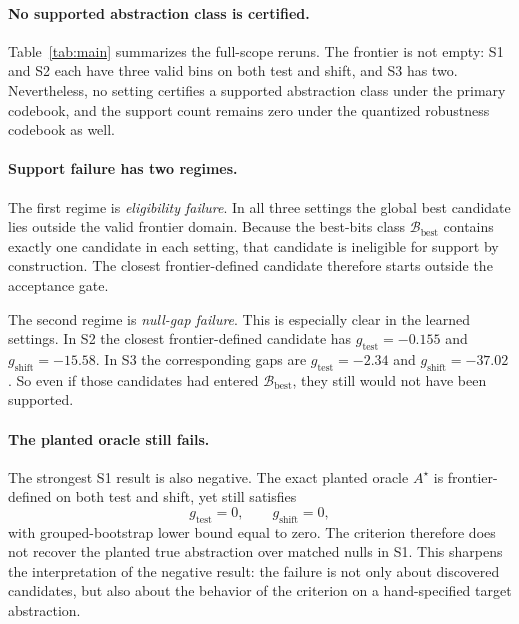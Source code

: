 \documentclass[10pt]{article}
\newcommand{\gtest}{g_{\mathrm{test}}}
\newcommand{\gshift}{g_{\mathrm{shift}}}
\newcommand{\Astar}{A^{\star}}
\newcommand{\Bbest}{\mathcal{B}_{\mathrm{best}}}
\begin{document}
\begin{table}[t]
\caption{\textbf{Main full-scope results.} ``Closest frontier-defined'' denotes the frontier-defined candidate with smallest test total bits/example. $\Delta$ is its gap in test bits/example to the global best candidate. In every setting, the best-bits class contains exactly one candidate, and that candidate is frontier-ineligible.}
\label{tab:main}
\centering
\footnotesize

\end{table}

\paragraph{No supported abstraction class is certified.}
Table~\ref{tab:main} summarizes the full-scope reruns. The frontier is not empty: S1 and S2 each have three valid bins on both test and shift, and S3 has two. Nevertheless, no setting certifies a supported abstraction class under the primary codebook, and the support count remains zero under the quantized robustness codebook as well.

\paragraph{Support failure has two regimes.}
The first regime is \emph{eligibility failure}. In all three settings the global best candidate lies outside the valid frontier domain. Because the best-bits class $\Bbest$ contains exactly one candidate in each setting, that candidate is ineligible for support by construction. The closest frontier-defined candidate therefore starts outside the acceptance gate.

The second regime is \emph{null-gap failure}. This is especially clear in the learned settings. In S2 the closest frontier-defined candidate has $\gtest=-0.155$ and $\gshift=-15.58$. In S3 the corresponding gaps are $\gtest=-2.34$ and $\gshift=-37.02$. So even if those candidates had entered $\Bbest$, they still would not have been supported.

\paragraph{The planted oracle still fails.}
The strongest S1 result is also negative. The exact planted oracle $\Astar$ is frontier-defined on both test and shift, yet still satisfies
\[
\gtest = 0,\qquad \gshift = 0,
\]
with grouped-bootstrap lower bound equal to zero. The criterion therefore does not recover the planted true abstraction over matched nulls in S1. This sharpens the interpretation of the negative result: the failure is not only about discovered candidates, but also about the behavior of the criterion on a hand-specified target abstraction.
\end{document}
